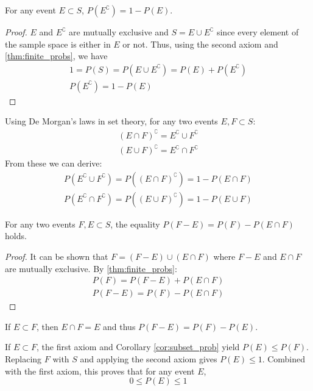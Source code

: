 \begin{theorem}
	For any event \( E \subset S \), \( P(E^\complement) = 1 - P(E) \).
\end{theorem}
\begin{proof}
	\( E \) and \( E^\complement \) are mutually exclusive and \( S = E \cup E^\complement \)
	since every element of the sample space is either in \( E \) or not.
	Thus, using the second axiom and \autoref{thm:finite_probs}, we have
	\begin{gather*}
		1 = P(S) = P(E \cup E^\complement) = P(E) + P(E^\complement)\\
		P(E^\complement) = 1 - P(E)
	\end{gather*}
\end{proof}
\begin{corollary}\label{cor:demorgan}
	Using De Morgan's laws in set theory, for any two events \( E, F \subset S \):
	\begin{align*}
		(E \cap F)^\complement = E^\complement \cup F^\complement\\
		(E \cup F)^\complement = E^\complement \cap F^\complement
	\end{align*}
	From these we can derive:
	\begin{align*}
		P(E^\complement \cup F^\complement) = P((E \cap F)^\complement) = 1 - P(E \cap F)\\
		P(E^\complement \cap F^\complement) = P((E \cup F)^\complement) = 1 - P(E \cup F)
	\end{align*}
\end{corollary}

\begin{theorem}\label{thm:difference_probs}
	For any two events \( F, E \subset S \), the equality \( P(F - E) = P(F) - P(E \cap F) \) holds.
\end{theorem}
\begin{proof}
	It can be shown that \( F = (F - E) \cup (E \cap F) \)
	where \( F - E \) and \( E \cap F \) are mutually exclusive.
	By \autoref{thm:finite_probs}:
	\begin{gather*}
		P(F) = P(F - E) + P(E \cap F)\\
		P(F - E) = P(F) - P(E \cap F)
	\end{gather*}
\end{proof}
\begin{corollary}\label{cor:subset_prob}
	If \( E \subset F \), then \( E \cap F = E \) and thus \( P(F - E) = P(F) - P(E) \).
\end{corollary}
\begin{corollary}
	If \( E \subset F \), the first axiom and Corollary \autoref{cor:subset_prob} yield \( P(E) \leq P(F) \).
	Replacing \( F \) with \( S \) and applying the second axiom gives \( P(E) \leq 1 \).
	Combined with the first axiom, this proves that for any event \( E \),
	\[
	0 \leq P(E) \leq 1
	\]
\end{corollary}

